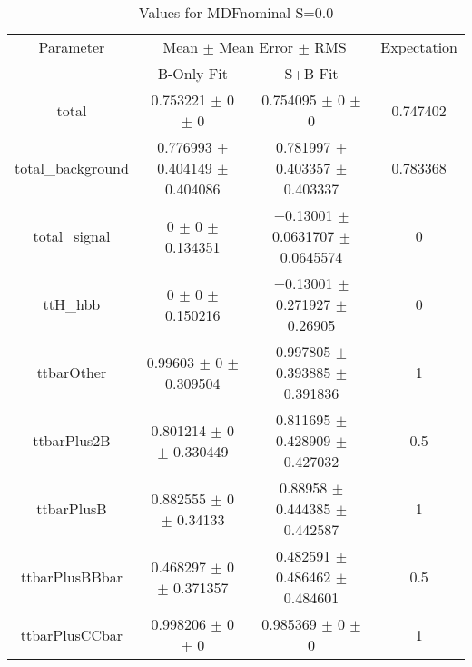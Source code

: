 \begin{table}
\centering
\caption{Values for MDFnominal S=0.0}
\begin{tabular}{cccc}
\toprule
Parameter & \multicolumn{2}{c}{Mean $\pm$ Mean Error $\pm$ RMS} & Expectation\\
 & B-Only Fit & S+B Fit & \\
\midrule
total & \num{0.753221} $\pm$ \num{0} $\pm$ \num{0} & \num{0.754095} $\pm$ \num{0} $\pm$ \num{0} & \num{0.747402}\\
total\_background & \num{0.776993} $\pm$ \num{0.404149} $\pm$ \num{0.404086} & \num{0.781997} $\pm$ \num{0.403357} $\pm$ \num{0.403337} & \num{0.783368}\\
total\_signal & \num{0} $\pm$ \num{0} $\pm$ \num{0.134351} & \num{-0.13001} $\pm$ \num{0.0631707} $\pm$ \num{0.0645574} & \num{0}\\
ttH\_hbb & \num{0} $\pm$ \num{0} $\pm$ \num{0.150216} & \num{-0.13001} $\pm$ \num{0.271927} $\pm$ \num{0.26905} & \num{0}\\
ttbarOther & \num{0.99603} $\pm$ \num{0} $\pm$ \num{0.309504} & \num{0.997805} $\pm$ \num{0.393885} $\pm$ \num{0.391836} & \num{1}\\
ttbarPlus2B & \num{0.801214} $\pm$ \num{0} $\pm$ \num{0.330449} & \num{0.811695} $\pm$ \num{0.428909} $\pm$ \num{0.427032} & \num{0.5}\\
ttbarPlusB & \num{0.882555} $\pm$ \num{0} $\pm$ \num{0.34133} & \num{0.88958} $\pm$ \num{0.444385} $\pm$ \num{0.442587} & \num{1}\\
ttbarPlusBBbar & \num{0.468297} $\pm$ \num{0} $\pm$ \num{0.371357} & \num{0.482591} $\pm$ \num{0.486462} $\pm$ \num{0.484601} & \num{0.5}\\
ttbarPlusCCbar & \num{0.998206} $\pm$ \num{0} $\pm$ \num{0} & \num{0.985369} $\pm$ \num{0} $\pm$ \num{0} & \num{1}\\
\bottomrule
\end{tabular}
\end{table}